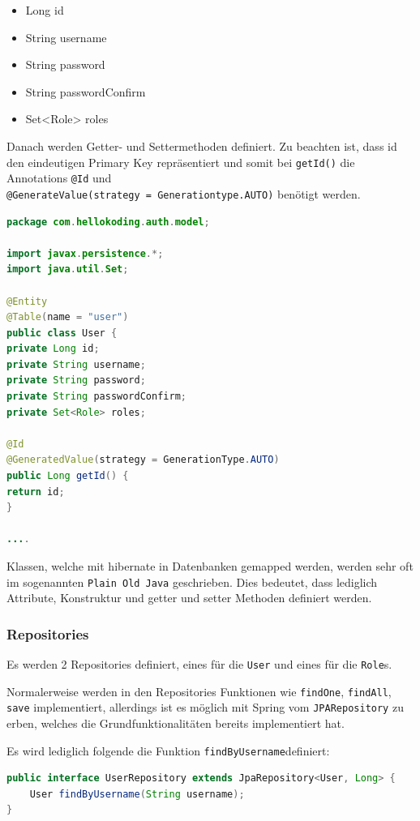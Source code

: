 \begin{itemize}
	\item Long id
	\item String username
	\item String password
	\item String passwordConfirm
	\item Set<Role> roles
\end{itemize} 

Danach werden Getter- und Settermethoden definiert. Zu beachten ist, dass id den eindeutigen Primary Key repräsentiert und somit bei \verb|getId()| die Annotations \verb|@Id| und\\
\verb|@GenerateValue(strategy = Generationtype.AUTO)| benötigt werden.

\begin{lstlisting}[language=java]
package com.hellokoding.auth.model;

import javax.persistence.*;
import java.util.Set;

@Entity
@Table(name = "user")
public class User {
private Long id;
private String username;
private String password;
private String passwordConfirm;
private Set<Role> roles;

@Id
@GeneratedValue(strategy = GenerationType.AUTO)
public Long getId() {
return id;
}

....


\end{lstlisting}

Klassen, welche mit hibernate in Datenbanken gemapped werden, werden sehr oft im sogenannten \verb|Plain Old Java| geschrieben. Dies bedeutet, dass lediglich Attribute, Konstruktur und getter und setter Methoden definiert werden.

\subsubsection{Repositories}
Es werden 2 Repositories definiert, eines für die \verb|User| und eines für die \verb|Role|s.

Normalerweise werden in den Repositories Funktionen wie \verb|findOne|, \verb|findAll|, \verb|save| implementiert, allerdings ist es möglich mit Spring vom \verb|JPARepository| zu erben, welches die Grundfunktionalitäten bereits implementiert hat.

Es wird lediglich folgende die Funktion \verb|findByUsername|definiert:

\begin{lstlisting}[language=Java]
public interface UserRepository extends JpaRepository<User, Long> {
	User findByUsername(String username);
}
\end{lstlisting}

